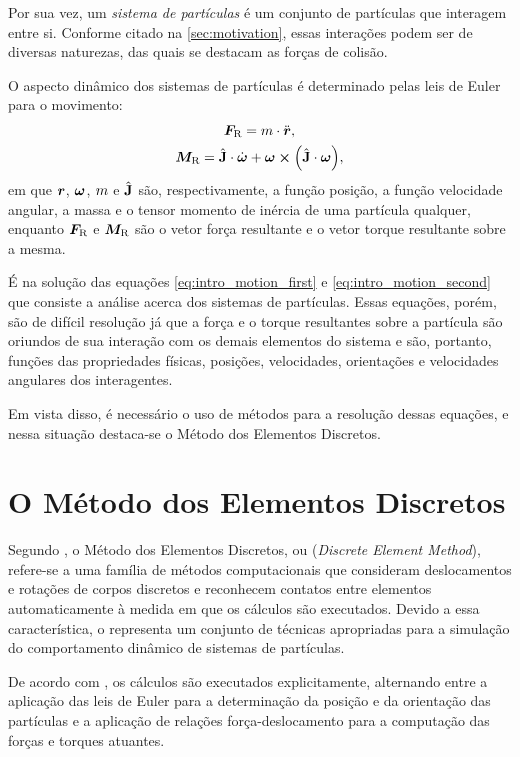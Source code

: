 Por sua vez, um \textit{sistema de partículas} é um conjunto de partículas que interagem entre si. Conforme citado na \autoref{sec:motivation}, essas interações podem ser de diversas naturezas, das quais se destacam as forças de colisão.

O aspecto dinâmico dos sistemas de partículas é determinado pelas leis de Euler para o movimento:
\begin{gather}
	{\resultingForce} = \mass\cdot\acceleration, \label{eq:intro_motion_first}\\
	{\resultingTorque} = \tensorOfInertia\cdot\deriv{1}{\angularVelocity} + \angularVelocity\cross\pqty{\tensorOfInertia\cdot\angularVelocity}, \label{eq:intro_motion_second}
\end{gather}
em que \(\bm{r}\), \(\bm{\omega}\), \(m\) e \(\hat{\mathbf{J}}\) são, respectivamente, a função posição, a função velocidade angular, a massa e o tensor momento de inércia de uma partícula qualquer, enquanto \({\bm{F}_{\text{R}}}\) e \({\bm{M}_{\text{R}}}\) são o vetor força resultante e o vetor torque resultante sobre a mesma.

É na solução das equações \eqref{eq:intro_motion_first} e \eqref{eq:intro_motion_second} que consiste a análise acerca dos sistemas de partículas. Essas equações, porém, são de difícil resolução já que a força e o torque resultantes sobre a partícula são oriundos de sua interação com os demais elementos do sistema e são, portanto, funções das propriedades físicas, posições, velocidades, orientações e velocidades angulares dos interagentes.

Em vista disso, é necessário o uso de métodos para a resolução dessas equações, e nessa situação destaca-se o Método dos Elementos Discretos.

\section{O Método dos Elementos Discretos} 

Segundo , o Método dos Elementos Discretos, ou \DEM{} (\textit{Discrete Element Method}), refere-se a uma família de métodos computacionais que consideram deslocamentos e rotações de corpos discretos e reconhecem contatos entre elementos automaticamente à medida em que os cálculos são executados. Devido a essa característica, o \DEM{} representa um conjunto de técnicas apropriadas para a simulação do comportamento dinâmico de sistemas de partículas.

De acordo com , os cálculos são executados explicitamente, alternando entre a aplicação das leis de Euler para a determinação da posição e da orientação das partículas e a aplicação de relações força-deslocamento para a computação das forças e torques atuantes.

